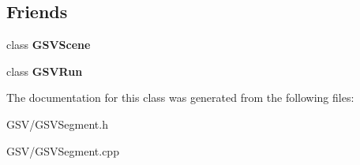 \subsection*{Friends}
\begin{DoxyCompactItemize}
\item 
class {\bfseries G\+S\+V\+Scene}\hypertarget{class_g_s_v_segment_a8abeebefd304625ce456ea1012bf4580}{}\label{class_g_s_v_segment_a8abeebefd304625ce456ea1012bf4580}

\item 
class {\bfseries G\+S\+V\+Run}\hypertarget{class_g_s_v_segment_ae54f10cc7f586c4696bcda2addbb27e0}{}\label{class_g_s_v_segment_ae54f10cc7f586c4696bcda2addbb27e0}

\end{DoxyCompactItemize}


The documentation for this class was generated from the following files\+:\begin{DoxyCompactItemize}
\item 
G\+S\+V/G\+S\+V\+Segment.\+h\item 
G\+S\+V/G\+S\+V\+Segment.\+cpp\end{DoxyCompactItemize}
